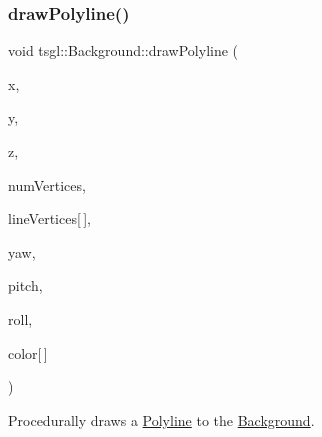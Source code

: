 \subsubsection{\texorpdfstring{draw\+Polyline()}{drawPolyline()}\hspace{0.1cm}{\footnotesize\ttfamily [2/2]}}
{\footnotesize\ttfamily void tsgl\+::\+Background\+::draw\+Polyline (\begin{DoxyParamCaption}\item[{float}]{x,  }\item[{float}]{y,  }\item[{float}]{z,  }\item[{int}]{num\+Vertices,  }\item[{float}]{line\+Vertices\mbox{[}$\,$\mbox{]},  }\item[{float}]{yaw,  }\item[{float}]{pitch,  }\item[{float}]{roll,  }\item[{\hyperlink{structtsgl_1_1_color_float}{Color\+Float}}]{color\mbox{[}$\,$\mbox{]} }\end{DoxyParamCaption})\hspace{0.3cm}{\ttfamily [virtual]}}



Procedurally draws a \hyperlink{classtsgl_1_1_polyline}{Polyline} to the \hyperlink{classtsgl_1_1_background}{Background}. 

